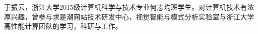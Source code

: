 \cleardoublepage
{}

于振云，浙江大学2015级计算机科学与技术专业何志均班学生。对计算机技术有浓厚兴趣，曾参与求是潮网站技术研发中心，视觉智能与模式分析实验室与浙江大学高性能计算团队的学习，科研与工作。